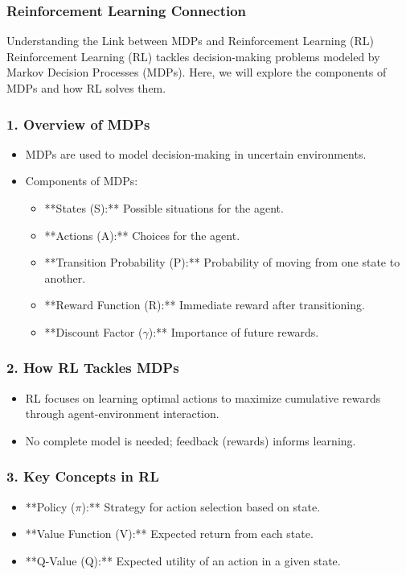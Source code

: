 \documentclass[aspectratio=169]{beamer}
\begin{document}
\begin{frame}[fragile]
    \frametitle{Reinforcement Learning Connection}
    \begin{block}{Understanding the Link between MDPs and Reinforcement Learning (RL)}
        Reinforcement Learning (RL) tackles decision-making problems modeled by Markov Decision Processes (MDPs). Here, we will explore the components of MDPs and how RL solves them.
    \end{block}
\end{frame}

\begin{frame}[fragile]
    \frametitle{1. Overview of MDPs}
    \begin{itemize}
        \item MDPs are used to model decision-making in uncertain environments.
        \item Components of MDPs:
        \begin{itemize}
            \item **States (S):** Possible situations for the agent.
            \item **Actions (A):** Choices for the agent.
            \item **Transition Probability (P):** Probability of moving from one state to another.
            \item **Reward Function (R):** Immediate reward after transitioning.
            \item **Discount Factor ($\gamma$):** Importance of future rewards.
        \end{itemize}
    \end{itemize}
\end{frame}

\begin{frame}[fragile]
    \frametitle{2. How RL Tackles MDPs}
    \begin{itemize}
        \item RL focuses on learning optimal actions to maximize cumulative rewards through agent-environment interaction.
        \item No complete model is needed; feedback (rewards) informs learning.
    \end{itemize}
\end{frame}

\begin{frame}[fragile]
    \frametitle{3. Key Concepts in RL}
    \begin{itemize}
        \item **Policy ($\pi$):** Strategy for action selection based on state.
        \item **Value Function (V):** Expected return from each state.
        \item **Q-Value (Q):** Expected utility of an action in a given state.
    \end{itemize}
\end{frame}
\end{document}
